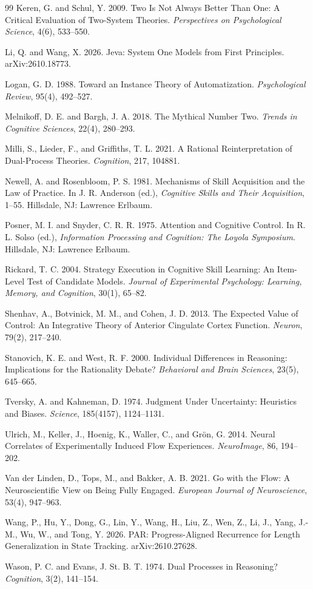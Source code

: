 \documentclass[11pt]{report}
\theoremstyle{remark}
\theoremstyle{definition}
\begin{document}
\begin{thebibliography}{99}
Keren, G. and Schul, Y. 2009. Two Is Not Always Better Than One: A Critical Evaluation of Two-System Theories. \emph{Perspectives on Psychological Science}, 4(6), 533--550.

Li, Q. and Wang, X. 2026. Jeva: System One Models from First Principles. arXiv:2610.18773.

Logan, G. D. 1988. Toward an Instance Theory of Automatization. \emph{Psychological Review}, 95(4), 492--527.

Melnikoff, D. E. and Bargh, J. A. 2018. The Mythical Number Two. \emph{Trends in Cognitive Sciences}, 22(4), 280--293.

Milli, S., Lieder, F., and Griffiths, T. L. 2021. A Rational Reinterpretation of Dual-Process Theories. \emph{Cognition}, 217, 104881.

Newell, A. and Rosenbloom, P. S. 1981. Mechanisms of Skill Acquisition and the Law of Practice. In J. R. Anderson (ed.), \emph{Cognitive Skills and Their Acquisition}, 1--55. Hillsdale, NJ: Lawrence Erlbaum.

Posner, M. I. and Snyder, C. R. R. 1975. Attention and Cognitive Control. In R. L. Solso (ed.), \emph{Information Processing and Cognition: The Loyola Symposium}. Hillsdale, NJ: Lawrence Erlbaum.

Rickard, T. C. 2004. Strategy Execution in Cognitive Skill Learning: An Item-Level Test of Candidate Models. \emph{Journal of Experimental Psychology: Learning, Memory, and Cognition}, 30(1), 65--82.

Shenhav, A., Botvinick, M. M., and Cohen, J. D. 2013. The Expected Value of Control: An Integrative Theory of Anterior Cingulate Cortex Function. \emph{Neuron}, 79(2), 217--240.

Stanovich, K. E. and West, R. F. 2000. Individual Differences in Reasoning: Implications for the Rationality Debate? \emph{Behavioral and Brain Sciences}, 23(5), 645--665.

Tversky, A. and Kahneman, D. 1974. Judgment Under Uncertainty: Heuristics and Biases. \emph{Science}, 185(4157), 1124--1131.

Ulrich, M., Keller, J., Hoenig, K., Waller, C., and Grön, G. 2014. Neural Correlates of Experimentally Induced Flow Experiences. \emph{NeuroImage}, 86, 194--202.

Van der Linden, D., Tops, M., and Bakker, A. B. 2021. Go with the Flow: A Neuroscientific View on Being Fully Engaged. \emph{European Journal of Neuroscience}, 53(4), 947--963.

Wang, P., Hu, Y., Dong, G., Lin, Y., Wang, H., Liu, Z., Wen, Z., Li, J., Yang, J.-M., Wu, W., and Tong, Y. 2026. PAR: Progress-Aligned Recurrence for Length Generalization in State Tracking. arXiv:2610.27628.

Wason, P. C. and Evans, J. St. B. T. 1974. Dual Processes in Reasoning? \emph{Cognition}, 3(2), 141--154.

\end{thebibliography}
\end{document}
